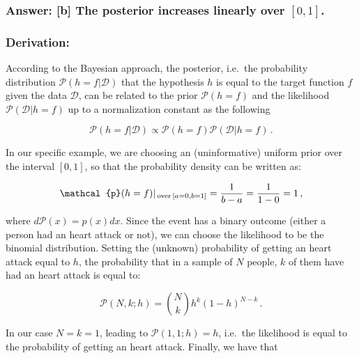 \documentclass[11pt]{article}
\begin{document}
\hypertarget{answer-b-the-posterior-increases-linearly-over-01.}{%
\subsubsection{\texorpdfstring{Answer: {[}b{]} The posterior increases
linearly over
\([0,1]\).}{Answer: {[}b{]} The posterior increases linearly over {[}0,1{]}.}}\label{answer-b-the-posterior-increases-linearly-over-01.}}

\hypertarget{derivation}{%
\subsubsection{Derivation:}\label{derivation}}

According to the Bayesian approach, the posterior, i.e.~the probability
distribution \(\mathcal{P}(h=f|\mathcal{D})\) that the hypothesis \(h\)
is equal to the target function \(f\) given the data \(\mathcal{D}\),
can be related to the prior \(\mathcal{P}(h=f)\) and the likelihood
\(\mathcal{P}(\mathcal{D}|h=f)\) up to a normalization constant as the
following

\begin{equation}
\mathcal{P}(h=f|\mathcal{D})\propto \mathcal{P}(h=f) \mathcal{P}(\mathcal{D}|h=f)\,.
\end{equation}

In our specific example, we are choosing an (uninformative) uniform
prior over the interval \([0,1]\), so that the probability density can
be written as:

\begin{equation}
\mathcal{p}(h=f)|_{ {\rm\, over\,} [a=0,b=1]}= \frac{1}{b-a}=\frac{1}{1-0}=1\,,
\end{equation}

where \(d\mathcal{P}(x)=p(x)dx\). Since the event has a binary outcome
(either a person had an heart attack or not), we can choose the
likelihood to be the binomial distribution. Setting the (unknown)
probability of getting an heart attack equal to \(h\), the probability
that in a sample of \(N\) people, \(k\) of them have had an heart attack
is equal to:

\begin{equation}
\mathcal{P}(N,k;h)= {N\choose k}h^k(1-h)^{N-k}\,.
\end{equation}

In our case \(N=k=1\), leading to \(\mathcal{P}(1,1;h)=h\), i.e.~the
likelihood is equal to the probability of getting an heart attack.
Finally, we have that
\end{document}
